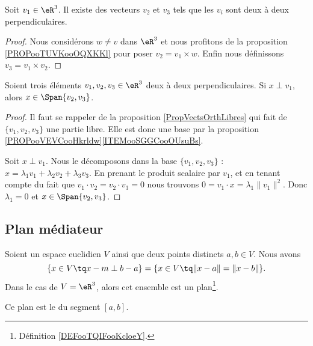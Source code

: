 \begin{lemma}       \label{LEMooGUVMooPXtXnV}
    Soit \( v_1\in \eR^3\). Il existe des vecteurs \( v_2\) et \( v_3\) tels que les \( v_i\) sont deux à deux perpendiculaires.
\end{lemma}

\begin{proof}
    Nous considérons \( w\neq v\) dans \( \eR^3\) et nous profitons de la proposition \ref{PROPooTUVKooOQXKKl} pour poser \( v_2=v_1\times w\). Enfin nous définissons \( v_3=v_1\times v_2\).
\end{proof}

\begin{lemma}       \label{LEMooGXGCooDfgbqG}
    Soient trois éléments \( v_1,v_2,v_3\in \eR^3\) deux à deux perpendiculaires. Si \( x\perp v_1\), alors \( x\in \Span\{ v_2,v_3 \}\).
\end{lemma}

\begin{proof}
    Il faut se rappeler de la proposition \ref{PropVectsOrthLibres} qui fait de \( \{ v_1,v_2,v_3 \}\) une partie libre. Elle est donc une base par la proposition \ref{PROPooVEVCooHkrldw}\ref{ITEMooSGGCooOUsuBs}.

    Soit \( x\perp v_1\). Nous le décomposons dans la base \( \{ v_1,v_2,v_3 \}\) : \( x=\lambda_1 v_1+\lambda_2 v_2+\lambda_3v_3\). En prenant le produit scalaire par \( v_1\), et en tenant compte du fait que \( v_1\cdot v_2=v_2\cdot v_3=0\) nous trouvons \( 0=v_1\cdot x=\lambda_1\| v_1 \|^2\). Donc \( \lambda_1=0\) et \( x\in \Span\{ v_2,v_3 \}\).
\end{proof}

\subsection{Plan médiateur}

\begin{proposition}
    Soient un espace euclidien \( V\) ainsi que deux points distincts \( a,b\in V\). Nous avons
    \begin{equation}
        \{ x\in V\tq x-m\perp b-a \}=\{ x\in V\tq \| x-a \|=\| x-b \| \}.
    \end{equation}
    Dans le cas de \( V=\eR^3\), alors cet ensemble est un plan\footnote{Définition \ref{DEFooTQIFooKcloeY}.}.

    Ce plan est le  du segment \( [a,b]\).
\end{proposition}

